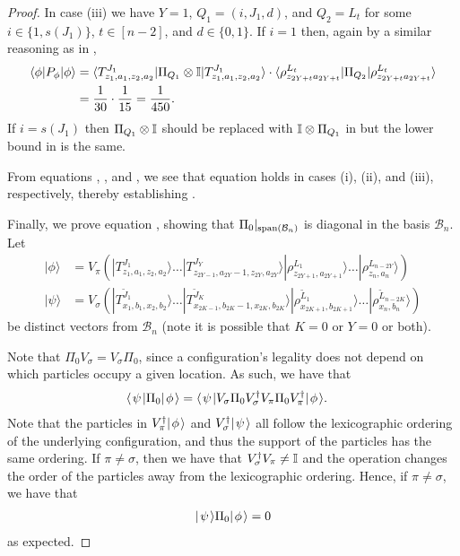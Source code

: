 \documentclass[../thesis-main/thesis-main]{subfiles}
\begin{document}
\begin{proof}
In case (iii) we have $Y=1$, $Q_{1}=(i,J_{1},d)$, and $Q_{2}=L_{t}$ for some $i\in\{1,s(J_{1})\}$, $t\in[n-2]$, and $d\in\{0,1\}$. If $i=1$ then, again by a similar reasoning as in , 
\begin{align}
\langle\phi|P_{\phi}|\phi\rangle & =\langle T_{z_{1},a_{1},z_{2},a_{2}}^{J_{1}}|\Pi_{Q_{1}}\otimes\mathbb{I}|T_{z_{1},a_{1},z_{2},a_{2}}^{J_{1}}\rangle\cdot\langle\rho_{z_{2Y+t}a_{2Y+t}}^{L_{t}}|\Pi_{Q_{2}}|\rho_{z_{2Y+t}a_{2Y+t}}^{L_{t}}\rangle\label{eq:lowerboundcase_c}\\
 & =\frac{1}{30}\cdot\frac{1}{15}=\frac{1}{450}.\label{eq:lowerboundcase_c_2}
\end{align}
If $i=s(J_{1})$ then $\Pi_{Q_{1}}\otimes\mathbb{I}$ should be replaced with $\mathbb{I}\otimes\Pi_{Q_{1}}$ in  but the lower bound in  is the same.

From equations , , and , we see that equation  holds in cases (i), (ii), and (iii), respectively, thereby establishing .

Finally, we prove equation , showing that $\Pi_{0}|_{\operatorname{span}(\mathcal{B}_{n})}$ is diagonal in the basis $\mathcal{B}_n$. Let 
\begin{align}
|\phi\rangle & =V_{\pi}(|T_{z_{1},a_{1},z_{2},a_{2}}^{J_{1}}\rangle\ldots|T_{z_{2Y-1},a_{2Y}-1,z_{2Y},a_{2Y}}^{J_{Y}}\rangle|\rho_{z_{2Y+1},a_{2Y+1}}^{L_{1}}\rangle\ldots|\rho_{z_{n},a_{n}}^{L_{n-2Y}}\rangle)\label{eq:phi_illegal}\\
|\psi\rangle & =V_{\sigma}(|T_{x_{1},b_{1},x_{2},b_{2}}^{\tilde{J}_{1}}\rangle\ldots|T_{x_{2K-1},b_{2K}-1,x_{2K},b_{2K}}^{\tilde{J}_{K}}\rangle|\rho_{x_{2K+1},b_{2K+1}}^{\tilde{L}_{1}}\rangle\ldots|\rho_{x_{n},b_{n}}^{\tilde{L}_{n-2K}}\rangle)
\end{align}
be distinct vectors from $\mathcal{B}_{n}$ (note it is possible that $K=0$ or $Y=0$ or both).

Note that $\Pi_0V_\sigma = V_\sigma \Pi_0$, since a configuration's legality does not depend on which particles occupy a given location.  As such, we have that 
\begin{align}
  \langle\mspace{2mu} \psi \mspace{2mu} | \Pi_0 |\mspace{2mu} \phi \mspace{2mu} \rangle &= \langle\mspace{2mu} \psi \mspace{2mu} | V_{\sigma} \Pi_0 V_{\sigma}^\dag V_{\pi} \Pi_0 V_{\pi}^\dag |\mspace{2mu} \phi \mspace{2mu} \rangle.
\end{align}
Note that the particles in $V_\pi^\dag |\mspace{2mu} \phi \mspace{2mu} \rangle$ and $V_{\sigma}^\dag |\mspace{2mu} \psi \mspace{2mu} \rangle$ all follow the lexicographic ordering of the underlying configuration, and thus the support of the particles has the same ordering.  If $\pi \neq \sigma$, then we have that $V_{\sigma}^\dag V_{\pi}\neq \mathbb{I}$ and the operation changes the order of the particles away from the lexicographic ordering.  Hence, if $\pi \neq \sigma$, we have that 
\begin{align}
  |\mspace{2mu} \psi \mspace{2mu} \rangle \Pi_0 |\mspace{2mu} \phi \mspace{2mu} \rangle = 0
\end{align}
as expected.


\end{proof}
\end{document}
